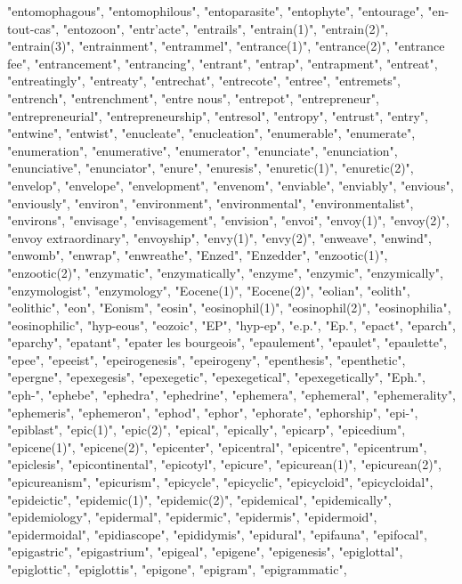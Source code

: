"entomophagous",
"entomophilous",
"entoparasite",
"entophyte",
"entourage",
"en-tout-cas",
"entozoon",
"entr'acte",
"entrails",
"entrain(1)",
"entrain(2)",
"entrain(3)",
"entrainment",
"entrammel",
"entrance(1)",
"entrance(2)",
"entrance fee",
"entrancement",
"entrancing",
"entrant",
"entrap",
"entrapment",
"entreat",
"entreatingly",
"entreaty",
"entrechat",
"entrecote",
"entree",
"entremets",
"entrench",
"entrenchment",
"entre nous",
"entrepot",
"entrepreneur",
"entrepreneurial",
"entrepreneurship",
"entresol",
"entropy",
"entrust",
"entry",
"entwine",
"entwist",
"enucleate",
"enucleation",
"enumerable",
"enumerate",
"enumeration",
"enumerative",
"enumerator",
"enunciate",
"enunciation",
"enunciative",
"enunciator",
"enure",
"enuresis",
"enuretic(1)",
"enuretic(2)",
"envelop",
"envelope",
"envelopment",
"envenom",
"enviable",
"enviably",
"envious",
"enviously",
"environ",
"environment",
"environmental",
"environmentalist",
"environs",
"envisage",
"envisagement",
"envision",
"envoi",
"envoy(1)",
"envoy(2)",
"envoy extraordinary",
"envoyship",
"envy(1)",
"envy(2)",
"enweave",
"enwind",
"enwomb",
"enwrap",
"enwreathe",
"Enzed",
"Enzedder",
"enzootic(1)",
"enzootic(2)",
"enzymatic",
"enzymatically",
"enzyme",
"enzymic",
"enzymically",
"enzymologist",
"enzymology",
"Eocene(1)",
"Eocene(2)",
"eolian",
"eolith",
"eolithic",
"eon",
"Eonism",
"eosin",
"eosinophil(1)",
"eosinophil(2)",
"eosinophilia",
"eosinophilic",
"hyp-eous",
"eozoic",
"EP",
"hyp-ep",
"e.p.",
"Ep.",
"epact",
"eparch",
"eparchy",
"epatant",
"epater les bourgeois",
"epaulement",
"epaulet",
"epaulette",
"epee",
"epeeist",
"epeirogenesis",
"epeirogeny",
"epenthesis",
"epenthetic",
"epergne",
"epexegesis",
"epexegetic",
"epexegetical",
"epexegetically",
"Eph.",
"eph-",
"ephebe",
"ephedra",
"ephedrine",
"ephemera",
"ephemeral",
"ephemerality",
"ephemeris",
"ephemeron",
"ephod",
"ephor",
"ephorate",
"ephorship",
"epi-",
"epiblast",
"epic(1)",
"epic(2)",
"epical",
"epically",
"epicarp",
"epicedium",
"epicene(1)",
"epicene(2)",
"epicenter",
"epicentral",
"epicentre",
"epicentrum",
"epiclesis",
"epicontinental",
"epicotyl",
"epicure",
"epicurean(1)",
"epicurean(2)",
"epicureanism",
"epicurism",
"epicycle",
"epicyclic",
"epicycloid",
"epicycloidal",
"epideictic",
"epidemic(1)",
"epidemic(2)",
"epidemical",
"epidemically",
"epidemiology",
"epidermal",
"epidermic",
"epidermis",
"epidermoid",
"epidermoidal",
"epidiascope",
"epididymis",
"epidural",
"epifauna",
"epifocal",
"epigastric",
"epigastrium",
"epigeal",
"epigene",
"epigenesis",
"epiglottal",
"epiglottic",
"epiglottis",
"epigone",
"epigram",
"epigrammatic",
